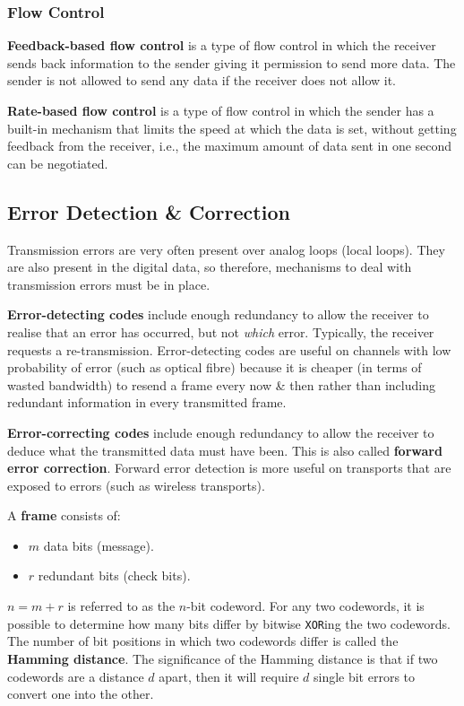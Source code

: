 \documentclass[11pt]{article}
\begin{document}
\subsubsection{Flow Control}
\textbf{Feedback-based flow control} is a type of flow control in which the receiver sends back information to the sender
giving it permission to send more data. 
The sender is not allowed to send any data if the receiver does not allow it. 

\textbf{Rate-based flow control} is a type of flow control in which the sender has a built-in mechanism that limits the 
speed at which the data is set, without getting feedback from the receiver, i.e., the maximum amount of data sent in one
second can be negotiated.

\subsection{Error Detection \& Correction}
Transmission errors are very often present over analog  loops (local loops). 
They are also present in the digital data, so therefore, mechanisms to deal with transmission errors must be in place.

\textbf{Error-detecting codes} include enough redundancy to allow the receiver to realise that an error has occurred, 
but not \textit{which} error. 
Typically, the receiver requests a re-transmission. 
Error-detecting codes are useful on channels with low probability of error (such as optical fibre) because it is 
cheaper (in terms of wasted bandwidth) to resend a frame every now \& then rather than including redundant information 
in every transmitted frame.

\textbf{Error-correcting codes} include enough redundancy to allow the receiver to deduce what the transmitted data 
must have been. 
This is also called \textbf{forward error correction}. 
Forward error detection is more useful on transports that are exposed to errors (such as wireless transports).

A \textbf{frame} consists of:
\begin{itemize}
    \item   $m$ data bits (message). 
    \item   $r$ redundant bits (check bits). 
\end{itemize}

$n = m + r$ is referred to as the $n$-bit codeword. 
For any two codewords, it is possible to determine how many bits differ by bitwise \verb|XOR|ing the two codewords. 
The number of bit positions in which two codewords differ is called the \textbf{Hamming distance}.
The significance of the Hamming distance is that if two codewords are a distance $d$ apart, then it will require $d$ single 
bit errors to convert one into the other. 
\end{document}
